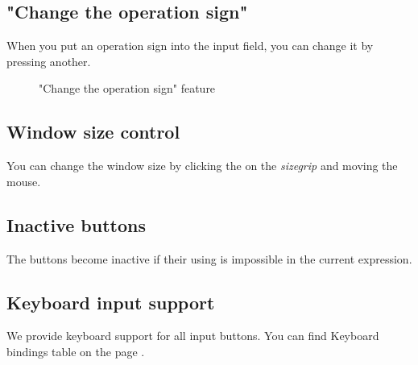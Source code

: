 \documentclass[a5paper, 11pt]{article}
\begin{document}
    \subsection{"Change the operation sign"}
        When you put an operation sign into the input field, you can change it by pressing another.
        \begin{figure}[h]
            \centering
            \caption{"Change the operation sign" feature}
            \label{pic:change_the_operation_sign}
        \end{figure}

    \subsection{Window size control}
        You can change the window size by clicking the  on the \emph{sizegrip} and moving the mouse.

    \subsection{Inactive buttons}
        The buttons become inactive if their using is impossible in the current expression.

    \subsection{Keyboard input support}
        We provide keyboard support for all input buttons. You can find Keyboard bindings table on the page \pageref{tab:Keyboard bindings}.
\end{document}
